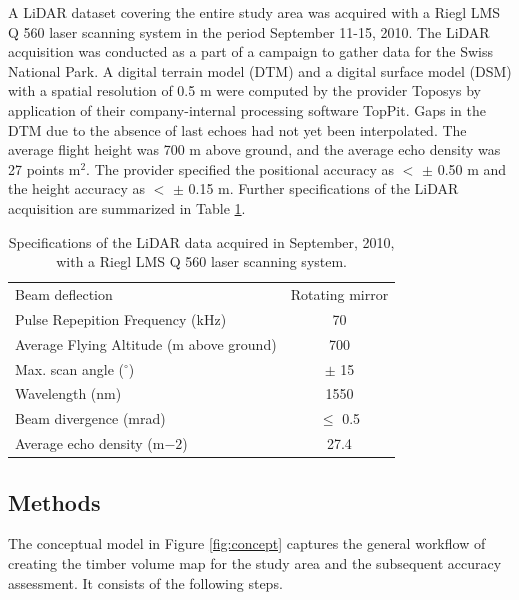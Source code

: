 A LiDAR dataset covering the entire study area was acquired with a Riegl LMS Q 560 laser scanning system in the period September 11-15, 2010. The LiDAR acquisition was conducted as a part of a campaign to gather data for the Swiss National Park. A digital terrain model (DTM) and a digital surface model (DSM) with a spatial resolution of 0.5 m were computed by the provider Toposys by application of their company-internal processing software TopPit. Gaps in the DTM due to the absence of last echoes had not yet been interpolated. The average flight height was 700 m above ground, and the average echo density was 27 points m$^2$. The provider specified the positional accuracy as $<$ $\pm$ 0.50 m and the height accuracy as $<$ $\pm$ 0.15 m. Further specifications of the LiDAR acquisition are summarized in Table \ref{tab:lidarspecs}.

\begin{table}[H]
	\begin{center}
		\caption{Specifications of the LiDAR data acquired in September, 2010, with a Riegl LMS Q 560 laser scanning system.}
		\vspace{0.2cm}
		\label{tab:lidarspecs}
		\begin{tabular}{|l|c|}
			\hline \hline
			Beam deflection & Rotating mirror \\
			Pulse Repepition Frequency (kHz) & 70 \\
			Average Flying Altitude (m above ground) & 700 \\
			Max. scan angle ($^\circ$) & $\pm$ 15  \\
			Wavelength (nm) & 1550 \\
			Beam divergence (mrad) & $\leq$ 0.5 \\
			Average echo density (m$-2$) & 27.4 \\
			\hline \hline
		\end{tabular} 
	\end{center}
\end{table}


\subsection{Methods}
\label{sec:met}

The conceptual model in Figure \ref{fig:concept} captures the general workflow of creating the timber volume map for the study area and the subsequent accuracy assessment. It consists of the following steps.

